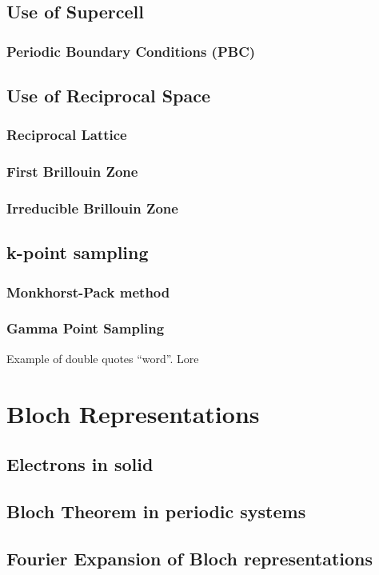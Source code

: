     \subsection{Use of Supercell}
        \subsubsection{Periodic Boundary Conditions (PBC)}
    \subsection{Use of Reciprocal Space}
        \subsubsection{Reciprocal Lattice}
        \subsubsection{First Brillouin Zone}
        \subsubsection{Irreducible Brillouin Zone}
    \subsection{k-point sampling}
        \subsubsection{Monkhorst-Pack method}
        \subsubsection{Gamma Point Sampling}
        Example of double quotes ``word''. Lore
\section{Bloch Representations}
    \subsection{Electrons in solid}
    \subsection{Bloch Theorem in periodic systems}
    \subsection{Fourier Expansion of Bloch representations}
